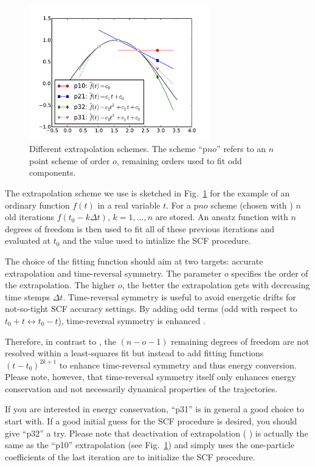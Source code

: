 \begin{figure}[hb]
  \centering
  \includegraphics[width=0.7\textwidth]{extra}
  \caption{Different extrapolation schemes.  The scheme ``p$no$'' refers to an
    $n$ point scheme of order $o$, remaining orders used to fit odd
    components.}
  \label{fig:wf_extra-pno}
\end{figure}
The extrapolation scheme we use is sketched in Fig.~\ref{fig:wf_extra-pno} for
the example of an ordinary function $f(t)$ in a real variable $t$.  For a
p$no$ scheme (chosen with  ) $n$ old iterations $f(t_0-k\Delta t)$, $k=1,\dotsc, n$ are stored.  An
ansatz function with $n$ degrees of freedom is then used to fit all of these
previous iterations and evaluated at $t_0$ and the value used to intialize the
SCF procedure.

The choice of the fitting function should aim at two targets: accurate
extrapolation and time-reversal symmetry.  The parameter $o$ specifies the
order of the extrapolation.  The higher $o$, the better the extrapolation gets
with decreasing time stemps $\Delta t$.  Time-reversal symmetry is useful to
avoid energetic drifts for not-so-tight SCF accuracy settings.  By adding odd
terms (odd with respect to $t_0+t \leftrightarrow t_0-t$), time-reversal
symmetry is enhanced \cite{Kolafa96-HOTR}.

Therefore, in contrast to \cite{Pulay04-FMD,Herbert-HG05-FMD}, the $(n-o-1)$
remaining degrees of freedom are not resolved within a least-squares fit but
instead to add fitting functions $(t-t_0)^{2k+1}$ to enhance time-reversal
symmetry and thus energy conversion.  Please note, however, that time-reversal
symmetry itself only enhances energy conservation and not necessarily
dynamical properties of the trajectories.

If you are interested in energy conservation, ``p31'' is in general a good
choice to start with.  If a good initial guess for the SCF procedure is
desired, you should give ``p32'' a try.  Please note that deactivation of
extrapolation ( ) is actually the same
as the ``p10'' extrapolation (see Fig.~\ref{fig:wf_extra-pno}) and simply uses
the one-particle coefficients of the last iteration are to initialize the SCF
procedure.


